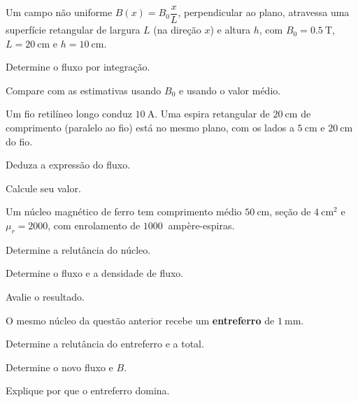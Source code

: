 \blocoaprofundamento
\begin{questao}[3]{}

Um campo não uniforme $B(x)=B_0\dfrac{x}{L}$, perpendicular ao plano, atravessa
uma superfície retangular de largura $L$ (na direção $x$) e altura $h$, com
$B_0=\SI{0.5}{\tesla}$, $L=\SI{20}{\centi\meter}$ e
$h=\SI{10}{\centi\meter}$.
\begin{itensq}
\item Determine o fluxo por integração.
\item Compare com as estimativas usando $B_0$ e usando o valor médio.
\end{itensq}


\end{questao}
\begin{questao}[3]{}

Um fio retilíneo longo conduz $\SI{10}{\ampere}$. Uma espira retangular de
$\SI{20}{\centi\meter}$ de comprimento (paralelo ao fio) está no mesmo plano,
com os lados a $\SI{5}{\centi\meter}$ e $\SI{20}{\centi\meter}$ do fio.
\begin{itensq}
\item Deduza a expressão do fluxo.
\item Calcule seu valor.
\end{itensq}


\end{questao}
\begin{questao}[3]{}

Um núcleo magnético de ferro tem comprimento médio $\SI{50}{\centi\meter}$,
seção de $\SI{4}{\centi\meter\squared}$ e $\mu_r=2000$, com enrolamento de
$\SI{1000}{}$ ampère-espiras.
\begin{itensq}
\item Determine a relutância do núcleo.
\item Determine o fluxo e a densidade de fluxo.
\item Avalie o resultado.
\end{itensq}


\end{questao}
\begin{questao}[3]{}

O mesmo núcleo da questão anterior recebe um \textbf{entreferro} de
$\SI{1}{\milli\meter}$.
\begin{itensq}
\item Determine a relutância do entreferro e a total.
\item Determine o novo fluxo e $B$.
\item Explique por que o entreferro domina.
\end{itensq}


\end{questao}
